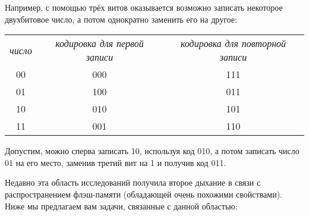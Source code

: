 Например, с помощью трёх витов оказывается возможно записать некоторое двухбитовое
число, а потом однократно заменить его на другое:
\begin{center}
\begin{tabular}{ccc}
{\itshape число}    & {\itshape кодировка для первой записи  }   & {\itshape кодировка для повторной записи}\\
00       & 000                             & 111\\
01       & 100                             & 011\\
10       & 010                             & 101\\
11       & 001                             & 110
\end{tabular}
\end{center}
Допустим, можно сперва записать 10, используя код 010, а потом записать число 01
на его место, заменив третий вит на 1 и получив код 011.

Недавно эта область исследований получила второе дыхание в связи с распространением
флэш-памяти (обладающей очень похожими свойствами). 
Ниже мы предлагаем вам задачи, связанные с данной областью:

